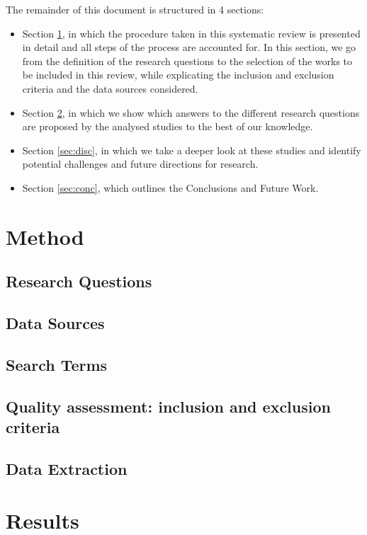 \documentclass[conference]{IEEEtran}
\begin{document}
The remainder of this document is structured in 4 sections:
\begin{itemize}
	\item Section \ref{sec:meth}, in which the procedure taken in this systematic review is presented in detail and all steps of the process are accounted for. In this section, we go from the definition of the research questions to the selection of the works to be included in this review, while explicating the inclusion and exclusion criteria and the data sources considered.
	\item Section \ref{sec:res}, in which we show which answers to the different research questions are proposed by the analysed studies to the best of our knowledge.
	\item Section \ref{sec:disc}, in which we take a deeper look at these studies and identify potential challenges and future directions for research.
	\item Section \ref{sec:conc}, which outlines the Conclusions and Future Work.
\end{itemize}


\section{Method}
\label{sec:meth}

\subsection{Research Questions}

\subsection{Data Sources}

\subsection{Search Terms}

\subsection{Quality assessment: inclusion and exclusion criteria}

\subsection{Data Extraction}

\section{Results}
\label{sec:res}
\end{document}
